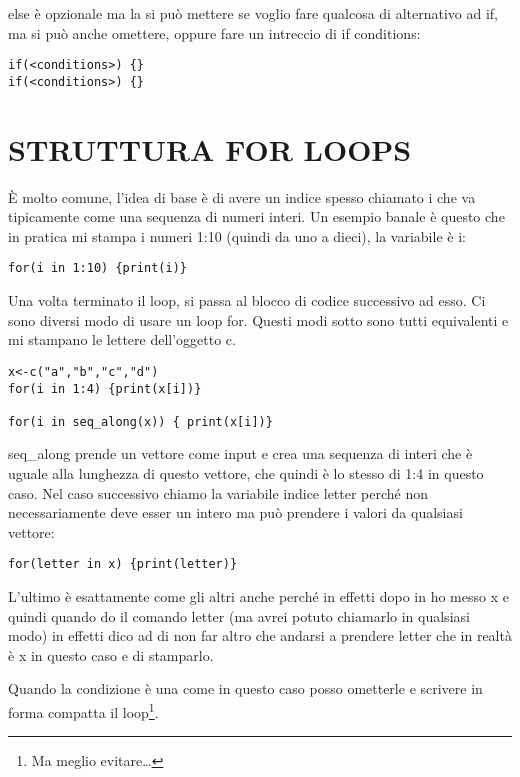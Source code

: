 else è opzionale ma la si può mettere se voglio fare qualcosa di alternativo ad if, ma si può anche omettere, oppure fare un intreccio
di if conditions:
\begin{lstlisting}
if(<conditions>) {}
if(<conditions>) {}
\end{lstlisting}

\section{STRUTTURA FOR LOOPS}

È molto comune, l'idea di base è di avere un indice spesso chiamato i che va tipicamente
come una sequenza di numeri interi.
Un esempio banale è questo che in pratica mi stampa i numeri 1:10
(quindi da uno a dieci), la variabile è i:

\begin{lstlisting}
for(i in 1:10) {print(i)}
\end{lstlisting}

Una volta terminato il loop, si passa al blocco di codice successivo ad esso.
Ci sono diversi modo di usare un loop for.
Questi modi sotto sono tutti equivalenti e mi stampano le lettere dell'oggetto c.

\begin{lstlisting}
x<-c("a","b","c","d")
for(i in 1:4) {print(x[i])}

for(i in seq_along(x)) { print(x[i])} 
\end{lstlisting}

seq\_along prende un vettore come input e crea una sequenza di interi
che è uguale alla lunghezza di questo vettore, che quindi è lo stesso di 1:4 in questo caso.
Nel caso successivo chiamo la variabile indice letter perché non necessariamente deve esser un intero ma può prendere i valori da qualsiasi vettore:

\begin{lstlisting}
for(letter in x) {print(letter)}
\end{lstlisting}

L'ultimo è esattamente come gli altri anche perché in effetti dopo in ho messo x e quindi quando do il comando letter (ma avrei potuto chiamarlo in qualsiasi modo) in effetti dico ad \erre di non far altro che andarsi a prendere letter che in realtà è x in questo caso e di stamparlo.

Quando la condizione è una come in questo caso posso ometterle e scrivere in forma compatta il loop\footnote{Ma meglio evitare\dots}.

